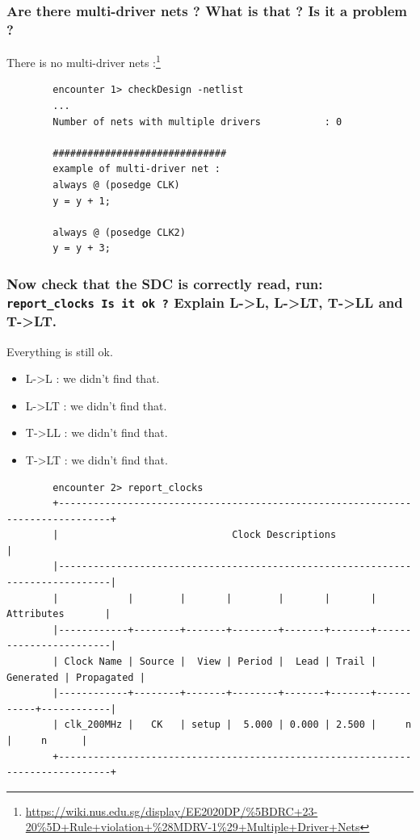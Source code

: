 \documentclass[11pt,a4paper,sans,dvipsnames]{report}
\begin{document}
	\subsubsection*{Are there multi-driver nets ? What is that ? Is it a problem ?}
	There is no multi-driver nets :\footnote{\url{https://wiki.nus.edu.sg/display/EE2020DP/\%5BDRC+23-20\%5D+Rule+violation+\%28MDRV-1\%29+Multiple+Driver+Nets}}
	\begin{lstlisting}
		encounter 1> checkDesign -netlist
		...
		Number of nets with multiple drivers           : 0

		##############################
		example of multi-driver net :
		always @ (posedge CLK)
		y = y + 1;

		always @ (posedge CLK2)
		y = y + 3;
	\end{lstlisting}


	\subsubsection*{Now check that the SDC is correctly read, run: \texttt{report\_clocks Is it ok ?}
		Explain L-\textgreater L, L-\textgreater LT, T-\textgreater LL and T-\textgreater LT.}
	Everything is still ok.
	\begin{itemize}
		\item L-\textgreater L : we didn't find that.
		\item L-\textgreater LT : we didn't find that.
		\item T-\textgreater LL : we didn't find that.
		\item T-\textgreater LT : we didn't find that.
	\end{itemize}
	\begin{lstlisting}
		encounter 2> report_clocks
		+-------------------------------------------------------------------------------+ 
		|                              Clock Descriptions                               | 
		|-------------------------------------------------------------------------------| 
		|            |        |       |        |       |       |       Attributes       | 
		|------------+--------+-------+--------+-------+-------+------------------------| 
		| Clock Name | Source |  View | Period |  Lead | Trail | Generated | Propagated | 
		|------------+--------+-------+--------+-------+-------+-----------+------------| 
		| clk_200MHz |   CK   | setup |  5.000 | 0.000 | 2.500 |     n     |     n      | 
		+-------------------------------------------------------------------------------+ 
	\end{lstlisting}
\end{document}
